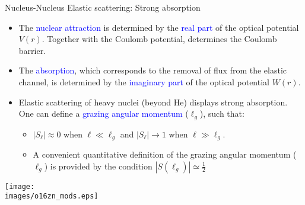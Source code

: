 \documentclass[english,10pt]{beamer}
\newcommand{\bi}{\begin{itemize}}
\newcommand{\ei}{\end{itemize}}
\newcommand{\half}{\frac{1}{2}}
\newcommand{\images}{images}
\begin{document}
\begin{frame}[fragile]{Nucleus-Nucleus Elastic scattering: Strong absorption}

\bi 
\small
\item The \textcolor{blue}{nuclear attraction} is determined by the \textcolor{blue}{real part} of the optical potential $V(r)$. Together with the Coulomb potential, determines the Coulomb barrier.

\item The \textcolor{blue}{absorption}, which corresponds to the removal of flux from the elastic channel, is determined by the \textcolor{blue}{imaginary part} of the optical potential $W(r)$.

\item  Elastic scattering of heavy nuclei (beyond He) displays strong absorption. One can define a \textcolor{blue}{grazing angular momentum} ($\ell_g$), such that: 
\bi
\item $|S_\ell| \approx 0$ when $\ell \ll \ell_g$ and $|S_\ell| \to 1$ when $\ell \gg \ell_g$. 
\item A convenient quantitative definition of the grazing angular momentum ($\ell_g$) is provided by the condition $|S(\ell_g)|\simeq \half$
\ei
\ei

\bigskip
 \begin{center}
  \texttt{[image: \\images/o16zn\_mods.eps]}
 \end{center}







\end{frame}
\end{document}
